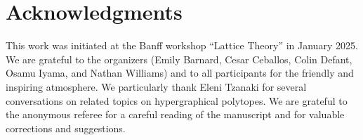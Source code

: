 \documentclass{amsart}
\theoremstyle{definition}
\begin{document}

\section*{Acknowledgments}

This work was initiated at the Banff workshop ``Lattice Theory'' in January 2025.
We are grateful to the organizers (Emily Barnard, Cesar Ceballos, Colin Defant, Osamu Iyama, and Nathan Williams) and to all participants for the friendly and inspiring atmosphere.
We particularly thank Eleni Tzanaki for several conversations on related topics on hypergraphical polytopes.
We are grateful to the anonymous referee for a careful reading of the manuscript and for valuable corrections and suggestions.




\label{sec:biblio}

\end{document}
